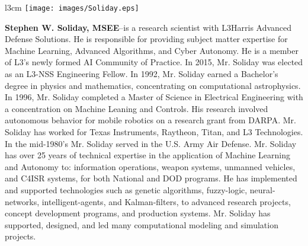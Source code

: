 \begin{wrapfigure}{l}{3cm}
\vspace{-14pt}
\texttt{[image: images/Soliday.eps]}
\end{wrapfigure}

\textbf{Stephen W. Soliday, MSEE}--is a
research scientist with L3Harris Advanced Defense Solutions.
He is responsible for providing subject matter expertise for Machine
Learning, Advanced Algorithms, and Cyber Autonomy. He is a member of
L3’s newly formed AI Community of Practice.  In 2015, Mr. Soliday was
elected as an L3-NSS Engineering Fellow.  In 1992, Mr. Soliday earned
a Bachelor’s degree in physics and mathematics, concentrating on
computational astrophysics. In 1996, Mr. Soliday completed a Master of
Science in Electrical Engineering with a concentration on Machine
Leaning and Controls. His research involved autonomous behavior for
mobile robotics on a research grant from DARPA. Mr. Soliday has worked
for Texas Instruments, Raytheon, Titan, and L3 Technologies. In the
mid-1980’s Mr. Soliday served in the U.S. Army Air Defense.
Mr. Soliday has over 25 years of technical expertise in the
application of Machine Learning and Autonomy to: information
operations, weapon systems, unmanned vehicles, and C4ISR systems, for
both National and DOD programs. He has implemented and supported
technologies such as genetic algorithms, fuzzy-logic, neural-networks,
intelligent-agents, and Kalman-filters, to advanced research projects,
concept development programs, and production systems.  Mr. Soliday has
supported, designed, and led many computational modeling and
simulation projects. 
